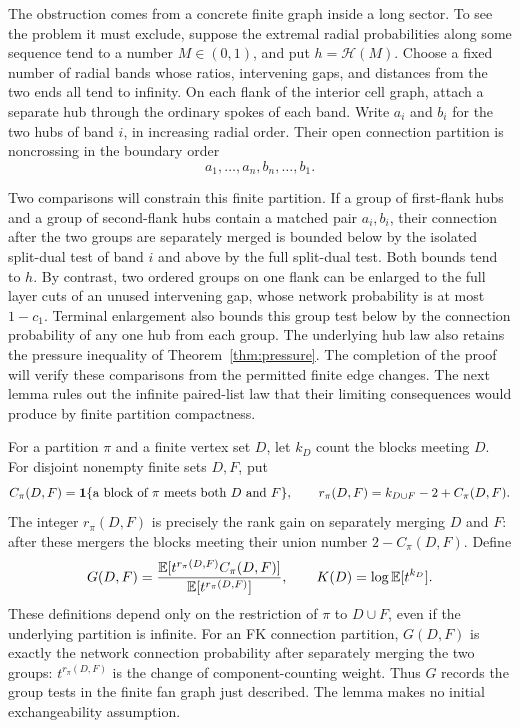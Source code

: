 The obstruction comes from a concrete finite graph inside a long
sector.  To see the problem it must exclude, suppose the extremal
radial probabilities along some sequence tend to a number
$M\in(0,1)$, and put $h=\mathcal H(M)$.  Choose a fixed number of
radial bands whose ratios, intervening gaps, and distances from the
two ends all tend to infinity.  On each flank of the interior cell
graph, attach a separate hub through the ordinary spokes of each
band.  Write $a_i$ and $b_i$ for the two hubs of band $i$, in increasing
radial order.  Their open connection partition is noncrossing in
the boundary order
\[
 a_1,\ldots,a_n,b_n,\ldots,b_1.
\]

Two comparisons will constrain this finite partition.  If a group of
first-flank hubs and a group of second-flank hubs contain a matched
pair $a_i,b_i$, their connection after the two groups are separately
merged is bounded below by the isolated split-dual test of band $i$
and above by the full split-dual test.  Both bounds tend to $h$.
By contrast, two ordered groups on one flank can be enlarged to the
full layer cuts of an unused intervening gap, whose network probability
is at most $1-c_1$.  Terminal enlargement also bounds this group test
below by the connection probability of any one hub from each group.
The underlying hub law also retains the pressure
inequality of Theorem~\ref{thm:pressure}.  The completion of the proof
will verify these comparisons from the permitted finite edge changes.
The next lemma rules out the infinite paired-list law that their
limiting consequences would produce by finite partition compactness.

For a partition $\pi$ and a finite vertex set $D$, let $k_D$ count the
blocks meeting $D$.  For disjoint nonempty finite sets $D,F$, put
\[
 C_\pi(D,F)=\mathbf 1\{\text{a block of $\pi$ meets both $D$ and $F$}\},
 \qquad r_\pi(D,F)=k_{D\cup F}-2+C_\pi(D,F).
\]
The integer $r_\pi(D,F)$ is precisely the rank gain on separately
merging $D$ and $F$: after these mergers the blocks meeting their
union number $2-C_\pi(D,F)$.  Define
\begin{equation}\label{sector:merger-functional}
 G(D,F)=\frac{\mathbb E[t^{r_\pi(D,F)}C_\pi(D,F)]}
                   {\mathbb E[t^{r_\pi(D,F)}]},
 \qquad K(D)=\log\mathbb E[t^{k_D}].
\end{equation}
These definitions depend only on the restriction of $\pi$ to
$D\cup F$, even if the underlying partition is infinite.
For an FK connection partition, $G(D,F)$ is exactly the network
connection probability after separately merging the two groups:
$t^{r_\pi(D,F)}$ is the change of component-counting weight.
Thus $G$ records the group tests in the finite fan graph just
described.  The lemma makes no initial exchangeability assumption.

